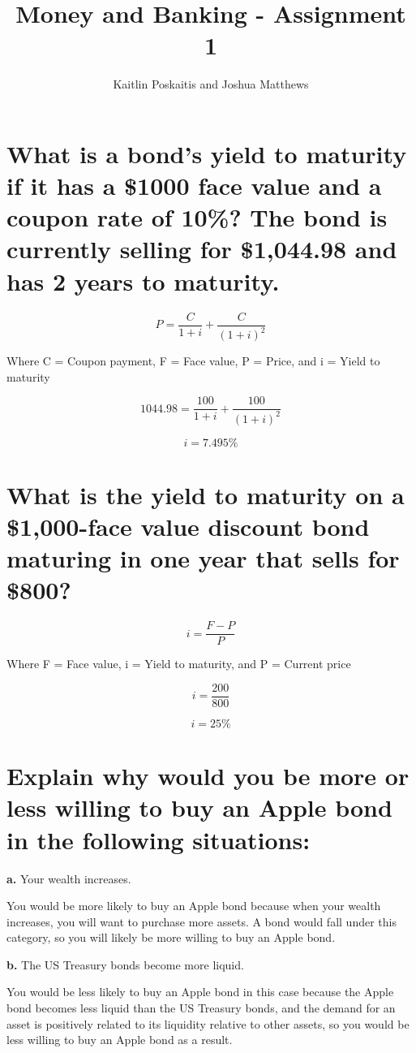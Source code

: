 \documentclass[12pt]{article}
\title{\bf Money and Banking - Assignment 1}
\author{Kaitlin Poskaitis and Joshua Matthews}
\date{}
\begin{document}
\maketitle

\section{What is a bond's yield to maturity if it has a \$1000 face value and a
coupon rate of 10\%? The bond is currently selling for \$1,044.98 and has 2 
years to maturity.}

$$P = \frac{C}{1+i} + \frac{C}{(1+i)^2}$$

Where C = Coupon payment, F = Face value, P = Price, and i = Yield to maturity

$$1044.98 = \frac{100}{1 + i} + \frac{100}{(1 + i)^2}$$

$$i = 7.495\%$$


\section{What is the yield to maturity on a \$1,000-face value discount bond
maturing in one year that sells for \$800?}

$$i = \frac{F - P}{P}$$

Where F = Face value, i = Yield to maturity, and P = Current price

$$i = \frac{200}{800}$$

$$i = 25\%$$


\section{Explain why would you be more or less willing to buy an Apple bond in
the following situations:}

{\bf a.} Your wealth increases.

You would be more likely to buy an Apple bond because when your wealth 
increases, you will want to purchase more assets. A bond would fall under this 
category, so you will likely be more willing to buy an Apple bond.

{\bf b.} The US Treasury bonds become more liquid.

You would be less likely to buy an Apple bond in this case because the Apple
bond becomes less liquid than the US Treasury bonds, and the demand for an 
asset is positively related to its liquidity relative to other assets, so
you would be less willing to buy an Apple bond as a result.
\end{document}
